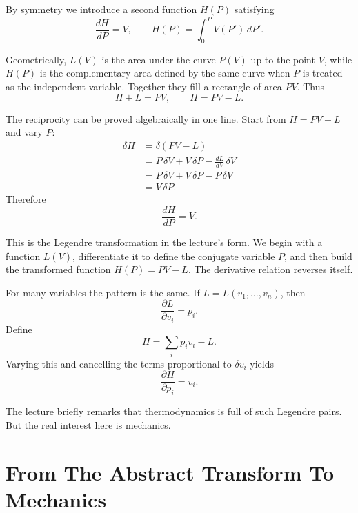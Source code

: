 By symmetry we introduce a second function \(H(P)\) satisfying
\begin{equation}
\frac{dH}{dP}=V,
\qquad
H(P)=\int_0^P V(P')\,dP'.
\end{equation}

Geometrically, \(L(V)\) is the area under the curve \(P(V)\) up to the point \(V\), while \(H(P)\) is the complementary area defined by the same curve when \(P\) is treated as the independent variable. Together they fill a rectangle of area \(PV\). Thus
\begin{equation}
H+L=PV,
\qquad
H=PV-L.
\end{equation}

The reciprocity can be proved algebraically in one line. Start from \(H=PV-L\) and vary \(P\):
\begin{align}
\delta H
&= \delta(PV-L) \\
&= P\,\delta V + V\,\delta P - \frac{dL}{dV}\,\delta V \\
&= P\,\delta V + V\,\delta P - P\,\delta V \\
&= V\,\delta P .
\end{align}
Therefore
\begin{equation}
\frac{dH}{dP}=V.
\end{equation}

This is the Legendre transformation in the lecture's form. We begin with a function \(L(V)\), differentiate it to define the conjugate variable \(P\), and then build the transformed function \(H(P)=PV-L\). The derivative relation reverses itself.

For many variables the pattern is the same. If \(L=L(v_1,\dots,v_n)\), then
\begin{equation}
\frac{\partial L}{\partial v_i}=p_i.
\end{equation}
Define
\begin{equation}
H=\sum_i p_i v_i-L.
\end{equation}
Varying this and cancelling the terms proportional to \(\delta v_i\) yields
\begin{equation}
\frac{\partial H}{\partial p_i}=v_i.
\end{equation}

The lecture briefly remarks that thermodynamics is full of such Legendre pairs. But the real interest here is mechanics.

\section{From The Abstract Transform To Mechanics}

